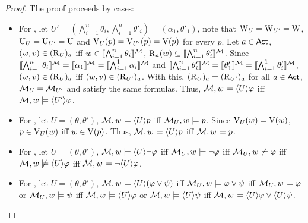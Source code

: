 \begin{proof} The proof proceeds by cases:
\begin{itemize}
\item For , let $U' = (\bigwedge_{i=1}^n \theta_i,\bigwedge_{i=1}^n \theta'_i) = (\alpha_1,\theta'_1)$, note that $\operatorname{W}_{{U}} = \operatorname{W}_{{U'}} = \operatorname{W}$, $\operatorname{U}_{{U}} = \operatorname{U}_{{U'}} = \operatorname{U}$ and $\operatorname{V}_{{U}}(p) = \operatorname{V}_{{U'}}(p) = \operatorname{V}(p)$ for every $p$. Let $a \in {\rm \sf Act}$, $(w,v) \in (\operatorname{R}_{{U}})_a$ iff $w \in \llbracket \bigwedge_{i=1}^n \theta_i \rrbracket^{\mathcal{M}}$, $\operatorname{R}_a(w) \subseteq \llbracket \bigwedge_{i=1}^n \theta'_i \rrbracket^{\mathcal{M}}$.
Since $\llbracket \bigwedge_{i=1}^n \theta_i \rrbracket^{\mathcal{M}} = \llbracket \alpha_1 \rrbracket^{\mathcal{M}} = \llbracket \bigwedge_{i=1}^1 \alpha_i \rrbracket^{\mathcal{M}}$ and $\llbracket \bigwedge_{i=1}^n \theta'_i \rrbracket^{\mathcal{M}} = \llbracket \theta'_1 \rrbracket^{\mathcal{M}} = \llbracket \bigwedge_{i=1}^1 \theta'_i \rrbracket^{\mathcal{M}}$, $(w,v) \in (\operatorname{R}_{{U}})_a$ iff $(w,v) \in (\operatorname{R}_{{U'}})_a$.
With this, $(\operatorname{R}_{{U}})_a = (\operatorname{R}_{{U'}})_a$ for all $a \in {\rm \sf Act}$, $\mathcal{M}_{{U}} = \mathcal{M}_{{U'}}$ and satisfy the same formulas.
Thus, $\mathcal{M},w \models \langle U \rangle\varphi$ iff $\mathcal{M},w \models \langle U' \rangle\varphi$.

\item For , let $U = (\theta,\theta')$, $\mathcal{M},w \models \langle U \rangle p$ iff $\mathcal{M}_{{U}},w \models p$. Since $\operatorname{V}_{{U}}(w) = \operatorname{V}(w)$, $p \in \operatorname{V}_{{U}}(w)$ iff $w \in \operatorname{V}(p)$. Thus, $\mathcal{M},w \models \langle U \rangle p$ iff $\mathcal{M},w \models p$.

\item For , let $U = (\theta,\theta')$, $\mathcal{M},w \models \langle U \rangle\neg\varphi$ iff $\mathcal{M}_{{U}},w \models \neg\varphi$ iff $\mathcal{M}_{{U}},w \not\models \varphi$ iff $\mathcal{M},w \not\models \langle U \rangle\varphi$ iff $\mathcal{M},w \models \neg\langle U \rangle\varphi$.

\item For , let $U = (\theta,\theta')$,
$\mathcal{M},w \models \langle U \rangle(\varphi \vee \psi)$ iff $\mathcal{M}_{{U}},w \models \varphi \vee \psi$ iff $\mathcal{M}_{{U}},w \models \varphi$ or $\mathcal{M}_{{U}},w \models \psi$ iff $\mathcal{M},w \models \langle U \rangle\varphi$ or $\mathcal{M},w \models \langle U \rangle\psi$ iff $\mathcal{M},w \models \langle U \rangle\varphi \vee \langle U \rangle\psi$.


\end{itemize}
\end{proof}
